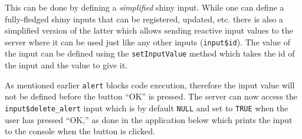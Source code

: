 \documentclass[
]{krantz}
\makeatletter
\newenvironment{Shaded}{\begin{snugshade}}{\end{snugshade}}
\newcommand{\CommentTok}[1]{\textcolor[rgb]{0.37,0.37,0.37}{\textit{#1}}}
\newcommand{\ControlFlowTok}[1]{\textcolor[rgb]{0.27,0.27,0.27}{\textbf{#1}}}
\newcommand{\DataTypeTok}[1]{\textcolor[rgb]{0.27,0.27,0.27}{#1}}
\newcommand{\KeywordTok}[1]{\textcolor[rgb]{0.27,0.27,0.27}{\textbf{#1}}}
\newcommand{\NormalTok}[1]{#1}
\newcommand{\OperatorTok}[1]{\textcolor[rgb]{0.43,0.43,0.43}{\textbf{#1}}}
\newcommand{\StringTok}[1]{\textcolor[rgb]{0.5,0.5,0.5}{#1}}
\newenvironment{kframe}{%
\medskip{}
\setlength{\fboxsep}{.8em}
 \def\at@end@of@kframe{}%
 \ifinner\ifhmode%
  \def\at@end@of@kframe{\end{minipage}}%
  \begin{minipage}{\columnwidth}%
 \fi\fi%
 \def\FrameCommand##1{\hskip\@totalleftmargin \hskip-\fboxsep
 \colorbox{shadecolor}{##1}\hskip-\fboxsep
     \hskip-\linewidth \hskip-\@totalleftmargin \hskip\columnwidth}%
 \MakeFramed {\advance\hsize-\width
   \@totalleftmargin\z@ \linewidth\hsize
   \@setminipage}}%
 {\par\unskip\endMakeFramed%
 \at@end@of@kframe}
\renewenvironment{Shaded}{\begin{kframe}}{\end{kframe}}
\makeatother
\begin{document}
This can be done by defining a \emph{simplified} shiny input. While one can define a fully-fledged shiny inputs that can be registered, updated, etc. there is also a simplified version of the latter which allows sending reactive input values to the server where it can be used just like any other inputs (\texttt{input\$id}). The value of the input can be defined using the \texttt{setInputValue} method which takes the id of the input and the value to give it.

\begin{Shaded}
\end{Shaded}

As mentioned earlier \texttt{alert} blocks code execution, therefore the input value will not be defined before the button ``OK'' is pressed. The server can now access the \texttt{input\$delete\_alert} input which is by default \texttt{NULL} and set to \texttt{TRUE} when the user has pressed ``OK,'' as done in the application below which prints the input to the console when the button is clicked.

\begin{Shaded}
\end{Shaded}
\end{document}
